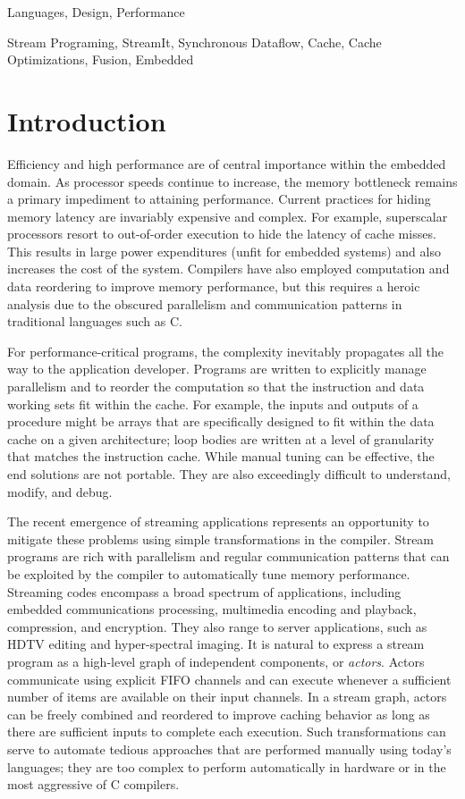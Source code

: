 \documentclass{sigplanconf}
\begin{document}
\terms 
Languages, Design, Performance

\keywords
Stream Programing, StreamIt, Synchronous Dataflow, Cache, Cache
Optimizations, Fusion, Embedded

\section{Introduction}

Efficiency and high performance are of central importance within the
embedded domain.  As processor speeds continue to increase, the memory
bottleneck remains a primary impediment to attaining performance.
Current practices for hiding memory latency are invariably expensive
and complex.  For example, superscalar processors resort to
out-of-order execution to hide the latency of cache misses.  This
results in large power expenditures (unfit for embedded systems) and
also increases the cost of the system.  Compilers have also employed
computation and data reordering to improve memory performance, but this requires
a heroic analysis due to the obscured parallelism and communication
patterns in traditional languages such as C.

For performance-critical programs, the complexity inevitably
propagates all the way to the application developer.  Programs are
written to explicitly manage parallelism and to reorder the
computation so that the instruction and data working sets fit within
the cache.  For example, the inputs and outputs of a procedure might
be arrays that are specifically designed to fit within the data cache
on a given architecture; loop bodies are written at a level of
granularity that matches the instruction cache.  While manual tuning
can be effective, the end solutions are not portable.  They are also
exceedingly difficult to understand, modify, and debug.

The recent emergence of streaming applications represents an
opportunity to mitigate these problems using simple transformations in
the compiler.  Stream programs are rich with parallelism and regular
communication patterns that can be exploited by the compiler to
automatically tune memory performance.  Streaming codes encompass a
broad spectrum of applications, including embedded communications
processing, multimedia encoding and playback, compression, and
encryption.  They also range to server applications, such as HDTV
editing and hyper-spectral imaging.  It is natural to express a stream
program as a high-level graph of independent components, or {\it
actors}.  Actors communicate using explicit FIFO channels and can
execute whenever a sufficient number of items are available on their
input channels.  In a stream graph, actors can be freely combined and
reordered to improve caching behavior as long as there are sufficient
inputs to complete each execution.  Such transformations can serve to
automate tedious approaches that are performed manually using today's
languages; they are too complex to perform automatically in hardware
or in the most aggressive of C compilers.
\end{document}
